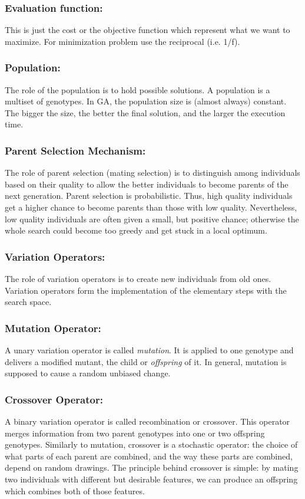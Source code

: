 \subsubsection*{Evaluation function:}
This is just the cost or the objective function which represent what we want to maximize. For minimization problem use the reciprocal (i.e. 1/f).

\subsubsection*{Population:}
The role of the population is to hold possible solutions. A population is a multiset of genotypes. In GA, the population size is (almost always) constant. The bigger the size, the better the final solution, and the larger the execution time.

\subsubsection*{Parent Selection Mechanism:}
The role of parent selection (mating selection) is to distinguish among individuals based on their quality to allow the better individuals to become parents of the next generation.
Parent selection is probabilistic. Thus, high quality individuals get a higher chance to become parents than those with low quality. Nevertheless, low quality individuals are often given a small, but positive chance; otherwise the whole search could become too greedy and get stuck in a local optimum.

\subsubsection*{Variation Operators:}
The role of variation operators is to create new individuals from old ones. Variation operators form the implementation of the elementary steps with the search space.

\subsubsection*{Mutation Operator:}
A unary variation operator is called \textit{mutation}. It is applied to one genotype and delivers a modified mutant, the child or \textit{offspring} of it.
In general, mutation is supposed to cause a random unbiased change. 

\subsubsection*{Crossover Operator:}
A binary variation operator is called recombination or crossover. This operator merges information from two parent genotypes into one or two offspring genotypes.
Similarly to mutation, crossover is a stochastic operator: the choice of what parts of each parent are combined, and the way these parts are combined, depend on random drawings.
The principle behind crossover is simple: by mating two individuals with different but desirable features, we can produce an offspring which combines both of those features.

